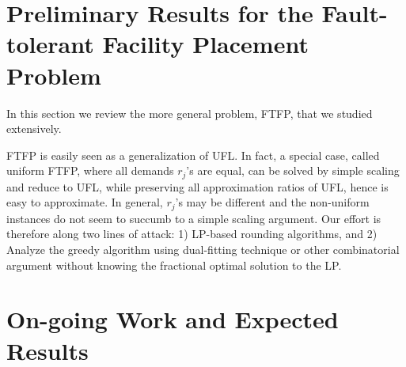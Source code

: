 \documentclass{article}[11pt]
\begin{document}
\section{Preliminary Results for the Fault-tolerant Facility Placement
  Problem}
In this section we review the more general problem, FTFP, that we
studied extensively.

FTFP is easily seen as a generalization of UFL. In fact, a special
case, called uniform FTFP, where all demands $r_j$'s are equal, can be
solved by simple scaling and reduce to UFL, while preserving all
approximation ratios of UFL, hence is easy to approximate. In general,
$r_j$'s may be different and the non-uniform instances do not seem to
succumb to a simple scaling argument. Our effort is therefore along
two lines of attack: 1) LP-based rounding algorithms, and 2) Analyze
the greedy algorithm using dual-fitting technique or other
combinatorial argument without knowing the fractional optimal solution
to the LP.

\section{On-going Work and Expected Results}
\end{document}
